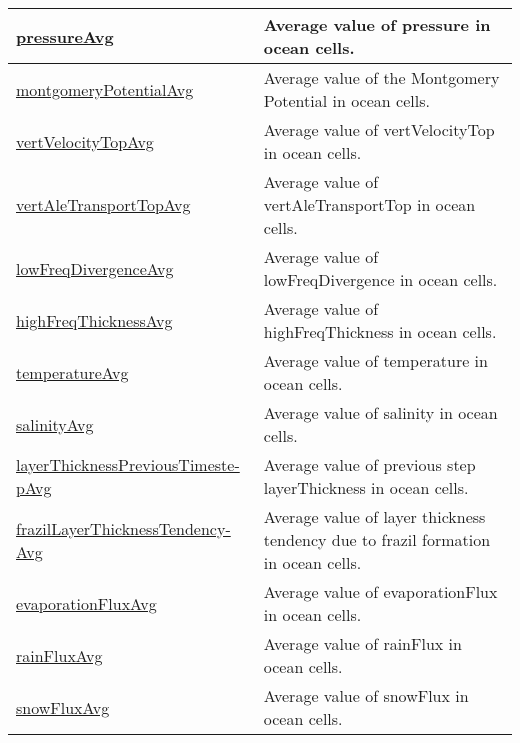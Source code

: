 {\begin{center}
\begin{longtable}{| p{2.0in} | p{4.0in} |}
    \hline
    \hyperref[subsec:var_sec_globalStatsAM_pressureAvg]{pressureAvg} & Average value of pressure in ocean cells. \\
    \hline
    \hyperref[subsec:var_sec_globalStatsAM_montgomeryPotentialAvg]{montgomeryPotentialAvg} & Average value of the Montgomery Potential in ocean cells. \\
    \hline
    \hyperref[subsec:var_sec_globalStatsAM_vertVelocityTopAvg]{vertVelocityTopAvg} & Average value of vertVelocityTop in ocean cells. \\
    \hline
    \hyperref[subsec:var_sec_globalStatsAM_vertAleTransportTopAvg]{vertAleTransportTopAvg} & Average value of vertAleTransportTop in ocean cells. \\
    \hline
    \hyperref[subsec:var_sec_globalStatsAM_lowFreqDivergenceAvg]{lowFreqDivergenceAvg} & Average value of lowFreqDivergence in ocean cells. \\
    \hline
    \hyperref[subsec:var_sec_globalStatsAM_highFreqThicknessAvg]{highFreqThicknessAvg} & Average value of highFreqThickness in ocean cells. \\
    \hline
    \hyperref[subsec:var_sec_globalStatsAM_temperatureAvg]{temperatureAvg} & Average value of temperature in ocean cells. \\
    \hline
    \hyperref[subsec:var_sec_globalStatsAM_salinityAvg]{salinityAvg} & Average value of salinity in ocean cells. \\
    \hline
    \hyperref[subsec:var_sec_globalStatsAM_layerThicknessPreviousTimestepAvg]{layerThicknessPreviousTimeste-}\hyperref[subsec:var_sec_globalStatsAM_layerThicknessPreviousTimestepAvg]{pAvg}  & Average value of previous step layerThickness in ocean cells. \\
    \hline
    \hyperref[subsec:var_sec_globalStatsAM_frazilLayerThicknessTendencyAvg]{frazilLayerThicknessTendency-}\hyperref[subsec:var_sec_globalStatsAM_frazilLayerThicknessTendencyAvg]{Avg}  & Average value of layer thickness tendency due to frazil formation in ocean cells. \\
    \hline
    \hyperref[subsec:var_sec_globalStatsAM_evaporationFluxAvg]{evaporationFluxAvg} & Average value of evaporationFlux in ocean cells. \\
    \hline
    \hyperref[subsec:var_sec_globalStatsAM_rainFluxAvg]{rainFluxAvg} & Average value of rainFlux in ocean cells. \\
    \hline
    \hyperref[subsec:var_sec_globalStatsAM_snowFluxAvg]{snowFluxAvg} & Average value of snowFlux in ocean cells. \\

\end{longtable}
\end{center}}
